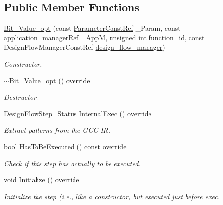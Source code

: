 \subsection*{Public Member Functions}
\begin{DoxyCompactItemize}
\item 
\hyperlink{classBit__Value__opt_aa7b2660093d2f3b18277d05e76750df4}{Bit\+\_\+\+Value\+\_\+opt} (const \hyperlink{Parameter_8hpp_a37841774a6fcb479b597fdf8955eb4ea}{Parameter\+Const\+Ref} \+\_\+\+Param, const \hyperlink{application__manager_8hpp_a04ccad4e5ee401e8934306672082c180}{application\+\_\+manager\+Ref} \+\_\+\+AppM, unsigned int \hyperlink{classFunctionFrontendFlowStep_a58ef2383ad1a212a8d3f396625a4b616}{function\+\_\+id}, const Design\+Flow\+Manager\+Const\+Ref \hyperlink{classDesignFlowStep_ab770677ddf087613add30024e16a5554}{design\+\_\+flow\+\_\+manager})
\begin{DoxyCompactList}\small\item\em Constructor. \end{DoxyCompactList}\item 
\hyperlink{classBit__Value__opt_a1b2ac3976ebd70c6afdc8d6ec1176b3d}{$\sim$\+Bit\+\_\+\+Value\+\_\+opt} () override
\begin{DoxyCompactList}\small\item\em Destructor. \end{DoxyCompactList}\item 
\hyperlink{design__flow__step_8hpp_afb1f0d73069c26076b8d31dbc8ebecdf}{Design\+Flow\+Step\+\_\+\+Status} \hyperlink{classBit__Value__opt_a54603f3942c41184e00ac94da081d044}{Internal\+Exec} () override
\begin{DoxyCompactList}\small\item\em Extract patterns from the G\+CC IR. \end{DoxyCompactList}\item 
bool \hyperlink{classBit__Value__opt_aca5d7fc33c82b8da126592bbd9e84588}{Has\+To\+Be\+Executed} () const override
\begin{DoxyCompactList}\small\item\em Check if this step has actually to be executed. \end{DoxyCompactList}\item 
void \hyperlink{classBit__Value__opt_a0034bd25e17bbf5e3fbd6c278ca10f2e}{Initialize} () override
\begin{DoxyCompactList}\small\item\em Initialize the step (i.\+e., like a constructor, but executed just before exec. \end{DoxyCompactList}\end{DoxyCompactItemize}

